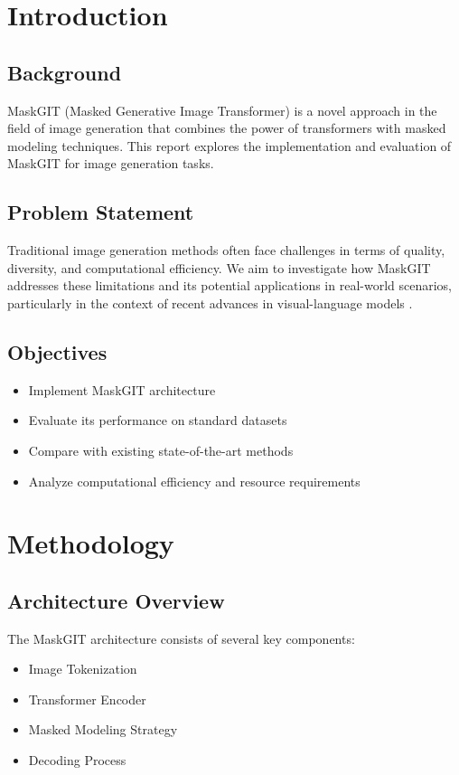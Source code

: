 \section{Introduction}
\subsection{Background}
MaskGIT (Masked Generative Image Transformer) \cite{chang2022maskgit} is a novel approach in the field of image generation that combines the power of transformers \cite{vaswani2017attention} with masked modeling techniques. This report explores the implementation and evaluation of MaskGIT for image generation tasks.

\subsection{Problem Statement}
Traditional image generation methods often face challenges in terms of quality, diversity, and computational efficiency. We aim to investigate how MaskGIT addresses these limitations and its potential applications in real-world scenarios, particularly in the context of recent advances in visual-language models \cite{radford2021learning}.

\subsection{Objectives}
\begin{itemize}
    \item Implement MaskGIT architecture
    \item Evaluate its performance on standard datasets
    \item Compare with existing state-of-the-art methods
    \item Analyze computational efficiency and resource requirements
\end{itemize}

\section{Methodology}
\subsection{Architecture Overview}
The MaskGIT architecture consists of several key components:
\begin{itemize}
    \item Image Tokenization
    \item Transformer Encoder
    \item Masked Modeling Strategy
    \item Decoding Process
\end{itemize}

